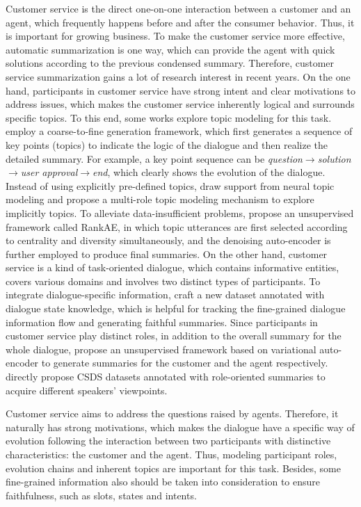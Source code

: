 \label{sec:cs}
Customer service is the direct one-on-one interaction between a customer and an agent, which frequently happens before and after the consumer behavior.
Thus, it is important for growing business. 
To make the customer service more effective, automatic summarization is one way, which can provide the agent with quick solutions according to the previous condensed summary.
Therefore, customer service summarization gains a lot of research interest in recent years.
On the one hand, participants in customer service have strong intent and clear motivations to address issues, which makes the customer service inherently logical and surrounds specific topics. To this end, some works explore topic modeling for this task.
 employ a coarse-to-fine generation framework, which first generates a sequence of key points (topics) to indicate the logic of the dialogue and then realize the detailed summary. For example, a key point sequence can be {\it question$\rightarrow$solution$\rightarrow$user approval$\rightarrow$end}, which clearly shows the evolution of the dialogue. 
Instead of using explicitly pre-defined topics,  draw support from neural topic modeling and propose a multi-role topic modeling mechanism to explore implicitly topics. 
To alleviate data-insufficient problems,  propose an unsupervised framework called RankAE, in which  topic utterances are first selected  according to centrality and diversity simultaneously, and the denoising auto-encoder is further employed to produce final summaries.
On the other hand, customer service is a kind of task-oriented dialogue, which contains informative entities, covers various domains and involves two distinct types of participants.
To integrate dialogue-specific information,  craft a new dataset annotated with dialogue state knowledge, which is helpful for tracking the fine-grained dialogue information flow and generating faithful summaries.
Since participants in customer service play distinct roles, in addition to the overall summary
for the whole dialogue,  propose an unsupervised framework based on variational auto-encoder to generate summaries for the customer and the agent respectively. 
 directly propose CSDS  datasets annotated with role-oriented summaries to acquire different speakers’ viewpoints.

Customer service aims to address the questions raised by agents. Therefore, it naturally has strong motivations, which makes the dialogue have a specific way of evolution following the interaction between two participants with distinctive characteristics: the customer and the agent. Thus, modeling participant roles, evolution chains and inherent topics are important for this task. Besides, some fine-grained information also should be taken into consideration to ensure faithfulness, such as slots, states and intents.

